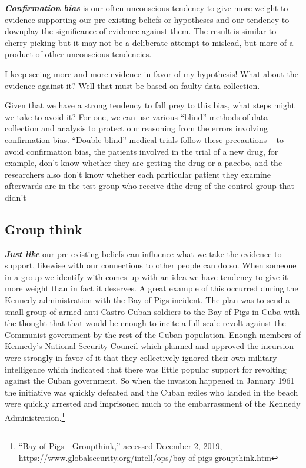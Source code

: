 \documentclass[
  12pt, openany]{book}
\begin{document}
\textbf{\emph{Confirmation bias}} is our often unconscious tendency to give more weight to evidence supporting our pre-existing beliefs or hypotheses and our tendency to downplay the significance of evidence against them. The result is similar to cherry picking but it may not be a deliberate attempt to mislead, but more of a product of other unconscious tendencies.

\begin{center}

\begin{argument}

I keep seeing more and more evidence in favor of my hypothesis! What about the evidence against it? Well that must be based on faulty data collection.

\end{argument}

\end{center}

Given that we have a strong tendency to fall prey to this bias, what steps might we take to avoid it? For one, we can use various ``blind'' methods of data collection and analysis to protect our reasoning from the errors involving confirmation bias. ``Double blind'' medical trials follow these precautions -- to avoid confirmation bias, the patients involved in the trial of a new drug, for example, don't know whether they are getting the drug or a pacebo, and the researchers also don't know whether each particular patient they examine afterwards are in the test group who receive dthe drug of the control group that didn't

\hypertarget{group-think}{%
\subsection*{Group think}\label{group-think}}


\textbf{\emph{Just like}} our pre-existing beliefs can influence what we take the evidence to support, likewise with our connections to other people can do so. When someone in a group we identify with comes up with an idea we have tendency to give it more weight than in fact it deserves. A great example of this occurred during the Kennedy administration with the Bay of Pigs incident. The plan was to send a small group of armed anti-Castro Cuban soldiers to the Bay of Pigs in Cuba with the thought that that would be enough to incite a full-scale revolt against the Communist government by the rest of the Cuban population. Enough members of Kennedy's National Security Council which planned and approved the incursion were strongly in favor of it that they collectively ignored their own military intelligence which indicated that there was little popular support for revolting against the Cuban government. So when the invasion happened in January 1961 the initiative was quickly defeated and the Cuban exiles who landed in the beach were quickly arrested and imprisoned much to the embarrassment of the Kennedy Administration.\footnote{``Bay of Pigs - Groupthink,'' accessed December 2, 2019, \url{https://www.globalsecurity.org/intell/ops/bay-of-pigs-groupthink.htm}}
\end{document}
